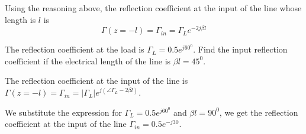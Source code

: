 \documentclass{ximera}
\begin{document}
Using the reasoning above, the reflection coefficient at the input of the line whose length is $l$ is
\begin{equation}
\Gamma(z=-l)=\Gamma_{in}=\Gamma_L e^{-2j \beta l}
\end{equation}

\begin{example}
The reflection coefficient at the load is $\Gamma_L=0.5 e^{j60^0}$. Find the input reflection coefficient if the electrical length of the line is $\beta l= 45^0$.

\begin{explanation}
The reflection coefficient at the input of the line is $\Gamma(z=-l)=\Gamma_{in}=|\Gamma_L| e^{j ( \angle \Gamma_L - 2 \beta l) }$. 

We substitute the expression for $\Gamma_L=0.5 e^{j60^0}$ and $\beta l= 90^0$, we get the reflection coefficient at the input of the line $\Gamma_{in}=0.5 e^{-j30 }$.

\end{explanation}

\end{example}
\end{document}
